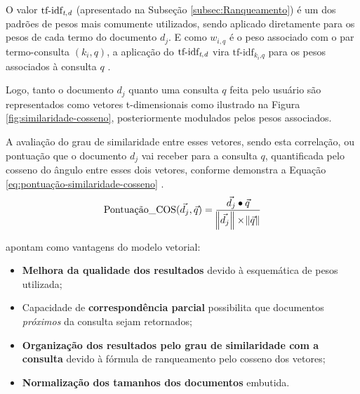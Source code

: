     O valor $\text{tf-idf}_{\text{\textit{t},\textit{d}}}$ (apresentado na Subseção \ref{subsec:Ranqueamento}) é um dos padrões de pesos mais comumente utilizados, sendo aplicado diretamente para os pesos de cada termo do documento $d_j$.
    E como $w_{i,q}$ é o peso associado com o par termo-consulta $(k_i, q)$, a aplicação do $\text{tf-idf}_{\text{\textit{t},\textit{d}}}$ vira $\text{tf-idf}_{k_i\text{,}\textit{q}}$ para os pesos associados à consulta $q$ \cite[p.~77--78]{Baeza-Yates2011}.
    
    Logo, tanto o documento $d_j$ quanto uma consulta $q$ feita pelo usuário são representados como vetores t-dimensionais como ilustrado na Figura \ref{fig:similaridade-cosseno}, posteriormente modulados pelos pesos associados.
    
    
    
    A avaliação do grau de similaridade entre esses vetores, sendo esta correlação, ou pontuação que o documento $d_j$ vai receber para a consulta $q$, quantificada pelo cosseno do ângulo entre esses dois vetores, conforme demonstra a Equação \ref{eq:pontuação-similaridade-cosseno} \cite[p.~78]{Baeza-Yates2011}.
    \begin{equation}
        \label{eq:pontuação-similaridade-cosseno}
		\text{Pontuação\_COS}(\vec{d_j}, \vec{q}) = \frac{\vec{d_j} \bullet \vec{q} }{ \norm{\vec{d_j}} \times \norm{\vec{q}} }
    \end{equation}

    
     apontam como vantagens do modelo vetorial:
    \begin{itemize}
        \item \textbf{Melhora da qualidade dos resultados} devido à esquemática de pesos utilizada;
        
        \item Capacidade de \textbf{correspondência parcial} possibilita que documentos \textit{próximos} da consulta sejam retornados;
        
        \item \textbf{Organização dos resultados pelo grau de similaridade com a consulta} devido à fórmula de ranqueamento pelo cosseno dos vetores;
        
        \item \textbf{Normalização dos tamanhos dos documentos} embutida.
    \end{itemize}
    
